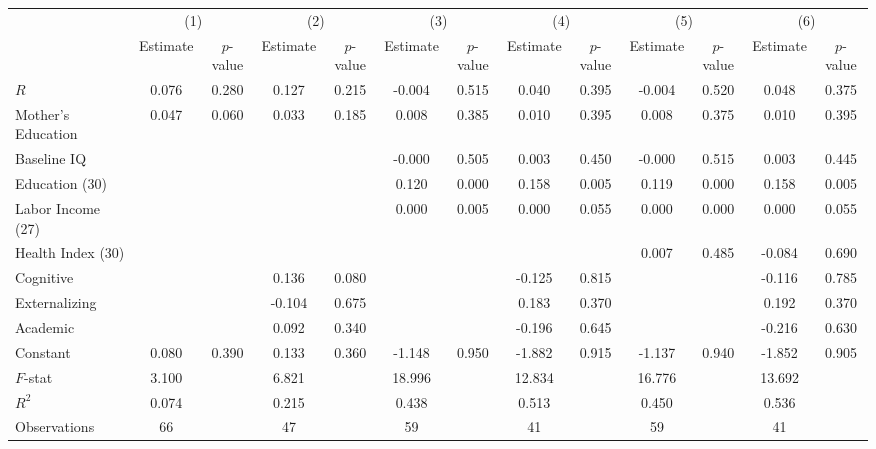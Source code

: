 \begin{table}[htbp]
\begin{tabular}{lcccccccccccc} \toprule
 & \multicolumn{2}{c}{(1)}  &  \multicolumn{2}{c}{(2)}  &  \multicolumn{2}{c}{(3)}  &  \multicolumn{2}{c}{(4)}  & \multicolumn{2}{c}{(5)} & \multicolumn{2}{c}{(6)} \\  
 & Estimate & $p$-value & Estimate & $p$-value & Estimate & $p$-value & Estimate & $p$-value & Estimate & $p$-value & Estimate & $p$-value \\ \midrule
$R$ &     0.076 &     0.280 &     0.127 &     0.215 &    -0.004 &     0.515 &     0.040 &     0.395 &    -0.004 &     0.520 &     0.048 &     0.375 \\  
Mother's Education &     0.047 &     0.060 &     0.033 &     0.185 &     0.008 &     0.385 &     0.010 &     0.395 &     0.008 &     0.375 &     0.010 &     0.395 \\  
Baseline IQ &          &          &         &         &    -0.000 &     0.505 &     0.003 &     0.450 &    -0.000 &     0.515 &     0.003 &     0.445 \\  
Education (30) &          &          &         &         &     0.120 &     0.000 &     0.158 &     0.005 &     0.119 &     0.000 &     0.158 &     0.005 \\  
Labor Income (27) &          &          &         &         &     0.000 &     0.005 &     0.000 &     0.055 &     0.000 &     0.000 &     0.000 &     0.055 \\  
Health Index (30) &          &         &         &         &         &         &         &         &     0.007 &     0.485 &    -0.084 &     0.690 \\  
Cognitive &          &          &     0.136 &     0.080 &         &         &    -0.125 &     0.815 &         &          &    -0.116 &     0.785 \\  
Externalizing &          &         &    -0.104 &     0.675 &         &         &     0.183 &     0.370 &          &         &     0.192 &     0.370 \\  
Academic &          &         &     0.092 &     0.340 &         &         &    -0.196 &     0.645 &          &          &    -0.216 &     0.630 \\  
Constant &     0.080 &     0.390 &     0.133 &     0.360 &    -1.148 &     0.950 &    -1.882 &     0.915 &    -1.137 &     0.940 &    -1.852 &     0.905 \\  \midrule
$F$-stat &     3.100 &          &     6.821 &         &    18.996 &         &    12.834 &         &    16.776 &          &    13.692 &         \\  
$R^2$ &     0.074 &          &     0.215 &         &     0.438 &         &     0.513 &         &     0.450 &         &     0.536 &         \\  
Observations &    66 &         &    47 &         &    59&         &    41 &         &    59&         &    41 &         \\  
\bottomrule \end{tabular}
\end{table}
